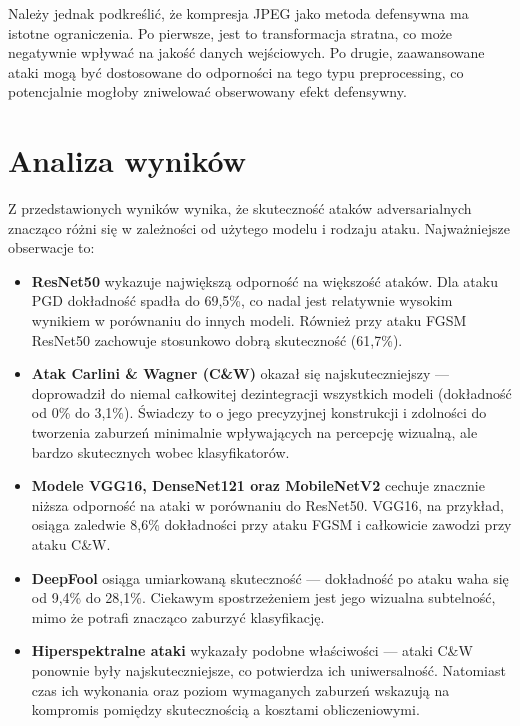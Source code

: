 \documentclass[12pt]{article}
\begin{document}
Należy jednak podkreślić, że kompresja JPEG jako metoda defensywna ma istotne ograniczenia. Po pierwsze, jest to transformacja stratna, co może negatywnie wpływać na jakość danych wejściowych. Po drugie, zaawansowane ataki mogą być dostosowane do odporności na tego typu preprocessing, co potencjalnie mogłoby zniwelować obserwowany efekt defensywny.

\section{Analiza wyników}

Z przedstawionych wyników wynika, że skuteczność ataków adversarialnych znacząco różni się w zależności od użytego modelu i rodzaju ataku. Najważniejsze obserwacje to:

\begin{itemize}
    \item \textbf{ResNet50} wykazuje największą odporność na większość ataków. Dla ataku PGD dokładność spadła do 69{,}5\%, co nadal jest relatywnie wysokim wynikiem w porównaniu do innych modeli. Również przy ataku FGSM ResNet50 zachowuje stosunkowo dobrą skuteczność (61{,}7\%).
    
    \item \textbf{Atak Carlini \& Wagner (C\&W)} okazał się najskuteczniejszy --- doprowadził do niemal całkowitej dezintegracji wszystkich modeli (dokładność od 0\% do 3{,}1\%). Świadczy to o jego precyzyjnej konstrukcji i zdolności do tworzenia zaburzeń minimalnie wpływających na percepcję wizualną, ale bardzo skutecznych wobec klasyfikatorów.
    
    \item \textbf{Modele VGG16, DenseNet121 oraz MobileNetV2} cechuje znacznie niższa odporność na ataki w porównaniu do ResNet50. VGG16, na przykład, osiąga zaledwie 8{,}6\% dokładności przy ataku FGSM i całkowicie zawodzi przy ataku C\&W.
    
    \item \textbf{DeepFool} osiąga umiarkowaną skuteczność — dokładność po ataku waha się od 9{,}4\% do 28{,}1\%. Ciekawym spostrzeżeniem jest jego wizualna subtelność, mimo że potrafi znacząco zaburzyć klasyfikację.
    
    \item \textbf{Hiperspektralne ataki} wykazały podobne właściwości — ataki C\&W ponownie były najskuteczniejsze, co potwierdza ich uniwersalność. Natomiast czas ich wykonania oraz poziom wymaganych zaburzeń wskazują na kompromis pomiędzy skutecznością a kosztami obliczeniowymi.
    

\end{itemize}
\end{document}

